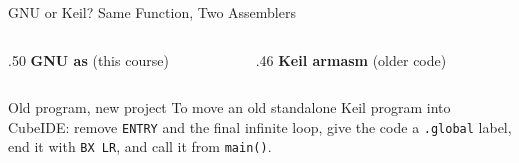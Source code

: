 \documentclass[9pt,aspectratio=169,xcolor=table]{beamer}
\begin{document}
{\beamerextras
\begin{frame}[fragile]{GNU or Keil? Same Function, Two Assemblers}
    \begin{columns}[T]
    \begin{column}{.50\textwidth}
        {\small\textbf{GNU as} (this course)}
    \end{column}
    \begin{column}{.46\textwidth}
        {\small\textbf{Keil armasm} (older code)}
    \end{column}
    \end{columns}

    \vspace{1mm}
    \begin{block}{Old program, new project}
        To move an old standalone Keil program into CubeIDE: remove \texttt{ENTRY} and the
        final infinite loop, give the code a \texttt{.global} label, end it with
        \texttt{BX LR}, and call it from \texttt{main()}.
    \end{block}
\end{frame}
}
\end{document}
